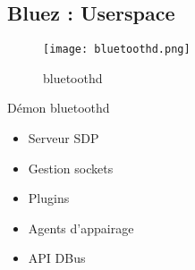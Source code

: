 \subsection{Bluez : Userspace}
\begin{frame}
\begin{minipage}[t]{0.60\linewidth}
	\begin{figure}
		\texttt{[image: bluetoothd.png]}
		\caption{bluetoothd}
	\end{figure}
\end{minipage}
\begin{minipage}[t]{0.30\linewidth}
	\begin{block}{Démon bluetoothd}
		\begin{itemize}
			\item Serveur SDP
			\item Gestion sockets
			\item Plugins
			\item Agents d'appairage
			\item API DBus
		\end{itemize}
	\end{block}
\end{minipage}
\end{frame}

